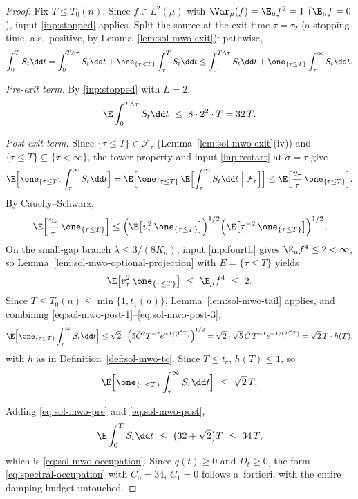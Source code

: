 \documentclass[../main.tex]{subfiles}
\begin{document}
\begin{proof}
Fix $T\le T_0(n)$.  Since $f\in L^2(\mu)$ with $\Var_\mu(f)=\E_\mu f^2=1$
($\E_\mu f=0$), input \ref{inp:stopped} applies.  Split the source at the exit time
$\tau=\tau_2$ (a stopping time, a.s.\ positive, by Lemma~\ref{lem:sol-mwo-exit}):
pathwise,
\[
  \int_0^TS_t\dd t
  =\int_0^{T\wedge\tau}S_t\dd t+\one_{\{\tau<T\}}\int_\tau^TS_t\dd t
  \le\int_0^{T\wedge\tau}S_t\dd t+\one_{\{\tau\le T\}}\int_\tau^\infty S_t\dd t .
\]

\emph{Pre-exit term.}  By \ref{inp:stopped} with $L=2$,
\begin{equation}
  \E\int_0^{T\wedge\tau}S_t\dd t\ \le\ 8\cdot2^2\cdot T=32\,T .
  \label{eq:sol-mwo-pre}
\end{equation}

\emph{Post-exit term.}  Since $\{\tau\le T\}\in\mathcal F_\tau$
(Lemma~\ref{lem:sol-mwo-exit}(iv)) and $\{\tau\le T\}\subseteq\{\tau<\infty\}$, the
tower property and input \ref{inp:restart} at $\sigma=\tau$ give
\begin{equation}
  \E\Bigl[\one_{\{\tau\le T\}}\int_\tau^\infty S_t\dd t\Bigr]
  =\E\Bigl[\one_{\{\tau\le T\}}\,
    \E\Bigl[\int_\tau^\infty S_t\dd t\Bigm|\mathcal F_\tau\Bigr]\Bigr]
  \le\E\Bigl[\frac{v_\tau}{\tau}\,\one_{\{\tau\le T\}}\Bigr].
  \label{eq:sol-mwo-post-1}
\end{equation}
By Cauchy--Schwarz,
\begin{equation}
  \E\Bigl[\frac{v_\tau}{\tau}\,\one_{\{\tau\le T\}}\Bigr]
  \le\Bigl(\E\bigl[v_\tau^2\,\one_{\{\tau\le T\}}\bigr]\Bigr)^{1/2}
    \Bigl(\E\bigl[\tau^{-2}\,\one_{\{\tau\le T\}}\bigr]\Bigr)^{1/2}.
  \label{eq:sol-mwo-post-2}
\end{equation}
On the small-gap branch $\lambda\le3/(8K_n)$, input \ref{inp:fourth} gives
$\E_\mu f^4\le2<\infty$, so Lemma~\ref{lem:sol-mwo-optional-projection} with
$E=\{\tau\le T\}$ yields
\begin{equation}
  \E\bigl[v_\tau^2\,\one_{\{\tau\le T\}}\bigr]\ \le\ \E_\mu f^4\ \le\ 2 .
  \label{eq:sol-mwo-post-3}
\end{equation}
Since $T\le T_0(n)\le\min\{1,t_1(n)\}$, Lemma~\ref{lem:sol-mwo-tail} applies, and
combining \eqref{eq:sol-mwo-post-1}--\eqref{eq:sol-mwo-post-3},
\[
  \E\Bigl[\one_{\{\tau\le T\}}\int_\tau^\infty S_t\dd t\Bigr]
  \le\sqrt2\cdot\Bigl(5\bar C^2T^{-2}e^{-1/(\bar CT)}\Bigr)^{1/2}
  =\sqrt2\cdot\sqrt5\,\bar C\,T^{-1}e^{-1/(2\bar CT)}
  =\sqrt2\,T\cdot h(T),
\]
with $h$ as in Definition~\ref{def:sol-mwo-tc}.  Since $T\le t_c$, $h(T)\le1$, so
\begin{equation}
  \E\Bigl[\one_{\{\tau\le T\}}\int_\tau^\infty S_t\dd t\Bigr]\ \le\ \sqrt2\,T .
  \label{eq:sol-mwo-post}
\end{equation}

Adding \eqref{eq:sol-mwo-pre} and \eqref{eq:sol-mwo-post},
\[
  \E\int_0^TS_t\dd t\ \le\ \bigl(32+\sqrt2\bigr)T\ \le\ 34\,T,
\]
which is \eqref{eq:sol-mwo-occupation}.  Since $q(t)\ge0$ and $D_t\ge0$, the
form \eqref{eq:spectral-occupation} with $C_0=34$, $C_1=0$ follows a~fortiori, with
the entire damping budget untouched.
\end{proof}
\end{document}
